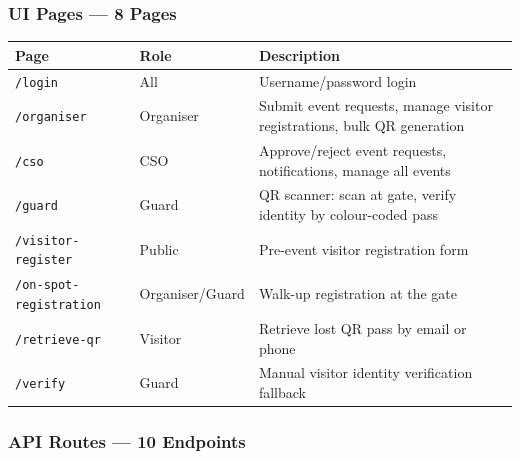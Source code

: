 \documentclass[12pt,a4paper]{article}
\begin{document}
\subsubsection{UI Pages — 8 Pages}

\begin{tabularx}{\textwidth}{L{5cm} L{2.5cm} X}
\toprule
{}
\textbf{Page} & \textbf{Role} & \textbf{Description} \\
\midrule
\texttt{/login} & All & Username/password login \\
\texttt{/organiser} & Organiser & Submit event requests, manage visitor registrations, bulk QR generation \\
\texttt{/cso} & CSO & Approve/reject event requests, notifications, manage all events \\
\texttt{/guard} & Guard & QR scanner: scan at gate, verify identity by colour-coded pass \\
\texttt{/visitor-register} & Public & Pre-event visitor registration form \\
\texttt{/on-spot-registration} & Organiser/Guard & Walk-up registration at the gate \\
\texttt{/retrieve-qr} & Visitor & Retrieve lost QR pass by email or phone \\
\texttt{/verify} & Guard & Manual visitor identity verification fallback \\
\bottomrule
\end{tabularx}

\subsubsection{API Routes — 10 Endpoints}
\end{document}
